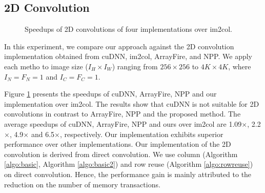 \subsection{2D Convolution\label{sec:ex2dc}}
\begin{figure}
\centering
{}
\hspace{0em}
	
\caption{Speedups of 2D convolutions of four implementations over im2col.}
\label{fig:2druntime}
\end{figure}



In this experiment, we compare our approach against the 2D convolution implementation obtained from cuDNN, im2col,  ArrayFire, and NPP. We
apply each metho to image size ($I_H \times I_W$) ranging from $256 \times 256$ to $4K \times 4K$, where $I_N=F_N=1$ and $I_C=F_C=1$.

Figure \ref{fig:2druntime} presents the speedups of cuDNN, ArrayFire, NPP and our implementation over im2col. The results show that cuDNN is not suitable for 2D convolutions in contrast to ArrayFire, NPP and the proposed method. The average speedups of cuDNN, ArrayFire, NPP and ours over im2col are 1.09$\times$, 2.2$\times$, 4.9$\times$ and 6.5$\times$, respectively. Our implementation exhibits superior performance over other implementations. Our implementation of the 2D convolution is derived from direct convolution. We use column (Algorithm \ref{algo:basic}, Algorithm \ref{algo:basic2}) and row reuse (Algorithm \ref{algo:rowreuse}) on direct convolution. Hence, the performance gain is mainly attributed to the reduction on the number of memory transactions.

